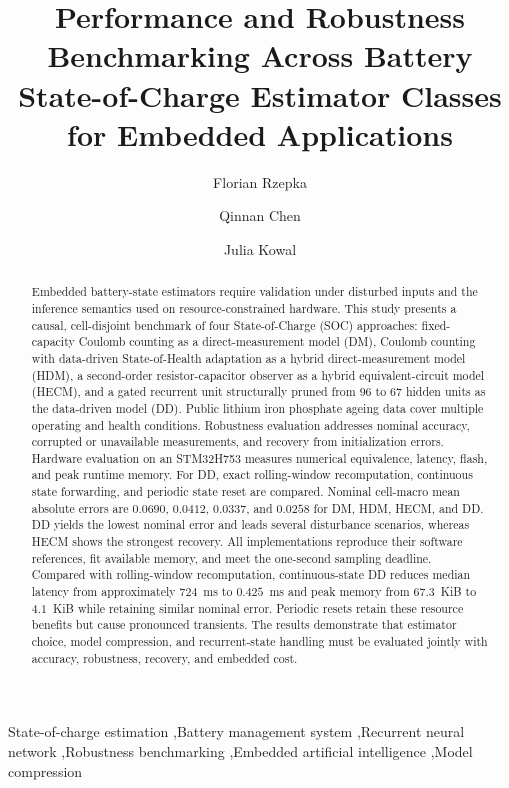 \documentclass[review,nopreprintline]{elsarticle}
\date{}
\newif\ifanonsubmission
\begin{document}
\begin{frontmatter}
\title{Performance and Robustness Benchmarking Across Battery State-of-Charge Estimator Classes for Embedded Applications}
\ifanonsubmission
\author{Anonymous}
\else
\author[1]{Florian Rzepka}
\author[1]{Qinnan Chen}
\author[1]{Julia Kowal}
\fi
\begin{abstract}
Embedded battery-state estimators require validation under disturbed inputs and the inference semantics used on resource-constrained hardware. This study presents a causal, cell-disjoint benchmark of four State-of-Charge (SOC) approaches: fixed-capacity Coulomb counting as a direct-measurement model (DM), Coulomb counting with data-driven State-of-Health adaptation as a hybrid direct-measurement model (HDM), a second-order resistor-capacitor observer as a hybrid equivalent-circuit model (HECM), and a gated recurrent unit structurally pruned from $96$ to $67$ hidden units as the data-driven model (DD). Public lithium iron phosphate ageing data cover multiple operating and health conditions. Robustness evaluation addresses nominal accuracy, corrupted or unavailable measurements, and recovery from initialization errors. Hardware evaluation on an STM32H753 measures numerical equivalence, latency, flash, and peak runtime memory. For DD, exact rolling-window recomputation, continuous state forwarding, and periodic state reset are compared. Nominal cell-macro mean absolute errors are $0.0690$, $0.0412$, $0.0337$, and $0.0258$ for DM, HDM, HECM, and DD. DD yields the lowest nominal error and leads several disturbance scenarios, whereas HECM shows the strongest recovery. All implementations reproduce their software references, fit available memory, and meet the one-second sampling deadline. Compared with rolling-window recomputation, continuous-state DD reduces median latency from approximately $724$~ms to $0.425$~ms and peak memory from $67.3$~KiB to $4.1$~KiB while retaining similar nominal error. Periodic resets retain these resource benefits but cause pronounced transients. The results demonstrate that estimator choice, model compression, and recurrent-state handling must be evaluated jointly with accuracy, robustness, recovery, and embedded cost.
\end{abstract}
\begin{keyword}
State-of-charge estimation \sep Battery management system \sep Recurrent neural network \sep Robustness benchmarking \sep Embedded artificial intelligence \sep Model compression
\end{keyword}
\end{frontmatter}
\linenumbers
\end{document}
